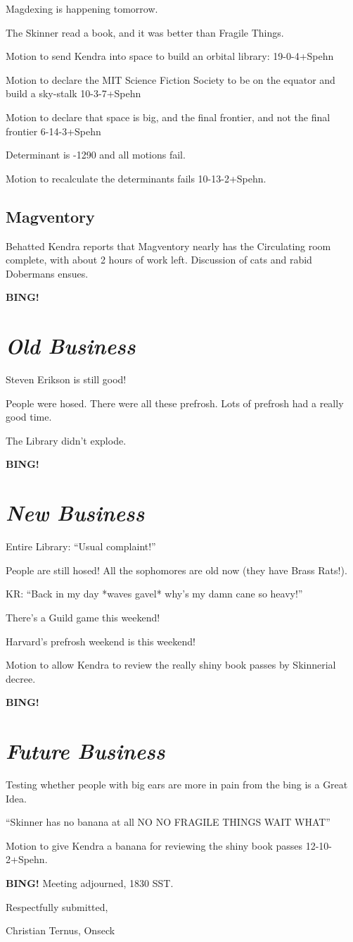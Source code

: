 \documentclass[10pt]{article}
\newcommand{\bing}{{\bf BING!} }
\newcommand{\goto}[1]{\bing \vskip 12pt \section*{{\em{#1}}}}
\begin{document}
Magdexing is happening tomorrow.

The Skinner read a book, and it was better than Fragile Things.

Motion to send Kendra into space to build an orbital library: 19-0-4+Spehn

Motion to declare the MIT Science Fiction Society to be on the equator and build a sky-stalk 10-3-7+Spehn

Motion to declare that space is big, and the final frontier, and not the final frontier 6-14-3+Spehn

Determinant is -1290 and all motions fail.

Motion to recalculate the determinants fails 10-13-2+Spehn.

\subsection*{Magventory}

Behatted Kendra reports that Magventory nearly has the Circulating room complete, with about 2 hours of work left.
Discussion of cats and rabid Dobermans ensues.

\goto{Old Business}

Steven Erikson is still good!

People were hosed.  There were all these prefrosh.  Lots of prefrosh had a really good time.

The Library didn't explode.

\goto{New Business}

Entire Library:  ``Usual complaint!''

People are still hosed!  All the sophomores are old now (they have Brass Rats!).

KR:  ``Back in my day *waves gavel* why's my damn cane so heavy!''

There's a Guild game this weekend!

Harvard's prefrosh weekend is this weekend!

Motion to allow Kendra to review the really shiny book passes by Skinnerial decree.

\goto{Future Business}

Testing whether people with big ears are more in pain from the bing is a Great Idea.

``Skinner has no banana at all NO NO FRAGILE THINGS WAIT WHAT''

Motion to give Kendra a banana for reviewing the shiny book passes 12-10-2+Spehn.

\bing
\noindent
Meeting adjourned, 1830 SST.

\vspace{18pt}

\centerline{Respectfully submitted,}
\centerline{Christian Ternus, Onseck}
\end{document}
